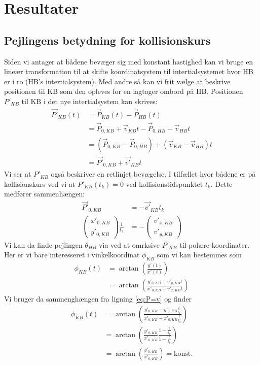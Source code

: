 \documentclass[%
 reprint,
nofootinbib,
aps,
]{revtex4-1}
\begin{document}
\section{Resultater}

\subsection{Pejlingens betydning for kollisionskurs}
Siden vi antager at bådene bevæger sig med konstant hastighed kan vi bruge en lineær transformation til at skifte koordinatsystem til intertialsystemet hvor HB er i ro (HB's intertialsystem). Med andre så kan vi frit vælge at beskrive positionen til KB som den opleves for en iagtager ombord på HB. Positionen $P'_{KB}$ til KB i det nye intertialsystem kan skrives:
\begin{align*}
  \vec{P'}_{KB}(t) &= \vec{P}_{KB}(t) - \vec{P}_{HB}(t) \\
  &= \vec{P}_{0,KB} + \vec{v}_{KB}t - \vec{P}_{0,HB} - \vec{v}_{HB}t \\
  &= (\vec{P}_{0,KB} - \vec{P}_{0,HB}) + (\vec{v}_{KB} - \vec{v}_{HB})t \\
  &= \vec{P'}_{0,KB} + \vec{v'}_{KB}t
\end{align*}
Vi ser at $P'_{KB}$ også beskriver en retlinjet bevægelse. I tilfællet hvor bådene er på kollisionskurs ved vi at $P'_{KB}(t_k) = 0$ ved kollisionstidspunktet $t_{k}$. Dette medfører sammenhængen:
\begin{align}
  \vec{P'}_{0,KB} &= - \vec{v'}_{KB}t_k \nonumber \\
  \begin{pmatrix} x'_{0,KB} \\ y'_{0,KB} \end{pmatrix}\frac{1}{t_k} &=   -\begin{pmatrix} v'_{x,KB} \\ v'_{y,KB} \end{pmatrix}
  \label{eq:P=v}
\end{align}
Vi kan da finde pejlingen $\theta_{HB}$ via ved at omrksive $P'_{KB}$ til polære koordinater. Her er vi bare interesseret i vinkelkoordinat $\phi_{KB}$ som vi kan bestemmes som
\begin{align*}
  \phi_{KB}(t) &= \arctan{\left( \frac{y'(t)}{x'(t)}\right)} \\
  &= \arctan{\left( \frac{y'_{0,KB} + v'_{y,KB}t}{x'_{0,KB} + v'_{x,KB}t}\right)}
\end{align*}
Vi bruger da sammenghængen fra ligning \ref{eq:P=v} og finder
\begin{align*}
  \phi_{KB}(t) &= \arctan{\left( \frac{y'_{0,KB} - y'_{0,KB}\frac{t}{t_k}}{x'_{0,KB} - x'_{0,KB}\frac{t}{t_k}}\right)} \\
  &= \arctan{\left(\frac{y'_{0,KB}}{x'_{0,KB}} \frac{1 - \frac{t}{t_k}}{1 - \frac{t}{t_k}}\right)} \\
  &= \arctan{\left(\frac{y'_{0,KB}}{x'_{0,KB}}\right)} = \text{konst.} \\
\end{align*}
\end{document}
